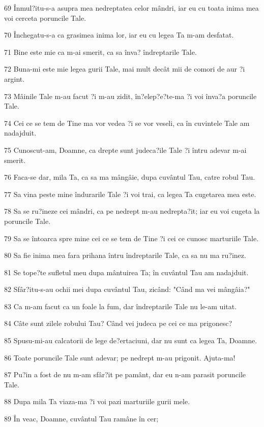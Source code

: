 \par 69 Înmul?itu-s-a asupra mea nedreptatea celor mândri, iar eu cu toata inima mea voi cerceta poruncile Tale.
\par 70 Închegatu-s-a ca grasimea inima lor, iar eu cu legea Ta m-am desfatat.
\par 71 Bine este mie ca m-ai smerit, ca sa înva? îndreptarile Tale.
\par 72 Buna-mi este mie legea gurii Tale, mai mult decât mii de comori de aur ?i argint.
\par 73 Mâinile Tale m-au facut ?i m-au zidit, în?elep?e?te-ma ?i voi înva?a poruncile Tale.
\par 74 Cei ce se tem de Tine ma vor vedea ?i se vor veseli, ca în cuvintele Tale am nadajduit.
\par 75 Cunoscut-am, Doamne, ca drepte sunt judeca?ile Tale ?i întru adevar m-ai smerit.
\par 76 Faca-se dar, mila Ta, ca sa ma mângâie, dupa cuvântul Tau, catre robul Tau.
\par 77 Sa vina peste mine îndurarile Tale ?i voi trai, ca legea Ta cugetarea mea este.
\par 78 Sa se ru?ineze cei mândri, ca pe nedrept m-au nedrepta?it; iar eu voi cugeta la poruncile Tale.
\par 79 Sa se întoarca spre mine cei ce se tem de Tine ?i cei ce cunosc marturiile Tale.
\par 80 Sa fie inima mea fara prihana întru îndreptarile Tale, ca sa nu ma ru?inez.
\par 81 Se tope?te sufletul meu dupa mântuirea Ta; în cuvântul Tau am nadajduit.
\par 82 Sfâr?itu-s-au ochii mei dupa cuvântul Tau, zicând: "Când ma vei mângâia?"
\par 83 Ca m-am facut ca un foale la fum, dar îndreptarile Tale nu le-am uitat.
\par 84 Câte sunt zilele robului Tau? Când vei judeca pe cei ce ma prigonesc?
\par 85 Spusu-mi-au calcatorii de lege de?ertaciuni, dar nu sunt ca legea Ta, Doamne.
\par 86 Toate poruncile Tale sunt adevar; pe nedrept m-au prigonit. Ajuta-ma!
\par 87 Pu?in a fost de nu m-am sfâr?it pe pamânt, dar eu n-am parasit poruncile Tale.
\par 88 Dupa mila Ta viaza-ma ?i voi pazi marturiile gurii mele.
\par 89 În veac, Doamne, cuvântul Tau ramâne în cer;
